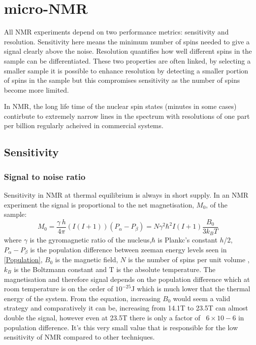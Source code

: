 
\chapter{micro-NMR}

All NMR experiments depend on two performance metrics: sensitivity and resolution. Sensitivity
here means the minimum number of spins needed to give a signal clearly above the noise. Resolution
quantifies how well different spins in the sample can be differentiated. These two properties
are often linked, by selecting a smaller sample it is possible to enhance resolution by detecting
a smaller portion of spins in the sample but this compromises sensitivity as the number of spins become more
limited.

 In NMR, the long life time of the nuclear spin states (minutes in some cases) contirbute to extremely
 narrow lines in the spectrum with resolutions of one part per billion regularly acheived in
 commercial systems.

 \section{Sensitivity}

 \subsection{Signal to noise ratio}


 Sensitivity in NMR at thermal equilibrium is always in short supply. In an NMR experiment the signal
 is proportional to the net magnetisation, $M_0$, of the sample\citep{webb2005nmr}:
\begin{equation}\label{eqn:Webb}
  M_0 = \frac{\gamma~h}{4\pi}(I(I+1))(P_{\alpha}-P_{\beta}) = N\gamma^2\hbar^2I(I+1)\frac{B_0}{3k_BT}
\end{equation}
where $\gamma$ is the gyromagnetic ratio of the nucleus,$\hbar$ is Plankc's constant $h$/2\pi, $P_{\alpha}-P_{\beta}$ is the population difference between zeeman energy levels seen in \ref{Population}, $B_0$ is the magnetic field, $N$ is
the number of spins per unit volume , $k_B$ is the Boltzmann constant and T is the absolute temperature. The magnetisation
and therefore signal depends on the population difference which at room temperature is on the order of $10^{-25}$J
which is much lower that the thermal energy of the system. From the equation, increasing $B_0$ would seem a
valid strategy and comparatively it can be, increasing from 14.1T to 23.5T can almost double the signal,
however even at 23.5T there is only a factor of ~$6\times10-6$ in population difference. It's this
very small value that is responsible for the low sensitivity of NMR compared to other techniques.

